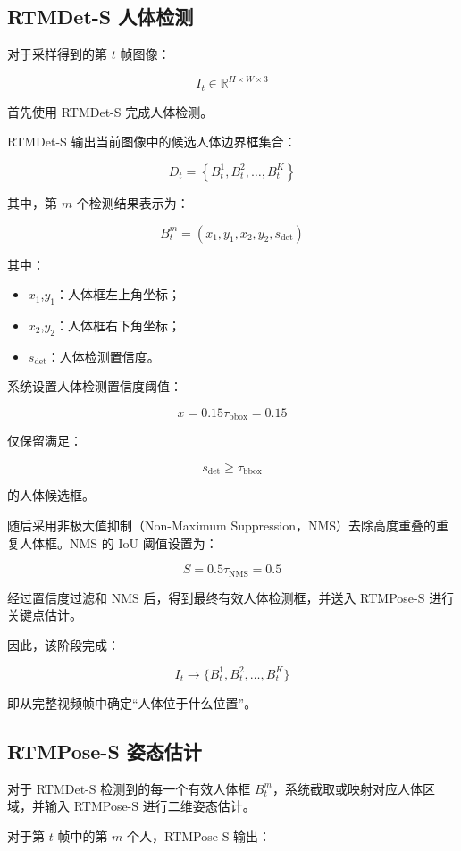 \subsection{RTMDet-S 人体检测}

对于采样得到的第 \(t\) 帧图像：

\[
I_t\in\mathbb{R}^{H\times W\times3}
\]

首先使用 RTMDet-S 完成人体检测。

RTMDet-S 输出当前图像中的候选人体边界框集合：

\[
D_t=
\left\{
B_t^1,B_t^2,\ldots,B_t^K
\right\}
\]

其中，第 \(m\) 个检测结果表示为：

\[
B_t^m=
(x_1,y_1,x_2,y_2,s_{\text{det}})
\]

其中：

\begin{itemize}
\item \(x_1\),\(y_1\)：人体框左上角坐标；
\item \(x_2\),\(y_2\)：人体框右下角坐标；
\item \(s_{\text{det}}\)：人体检测置信度。
\end{itemize}

系统设置人体检测置信度阈值：

\[
x=0.15\tau_{\text{bbox}}=0.15
\]

仅保留满足：

\[
s_{\text{det}}\geq\tau_{\text{bbox}}
\]

的人体候选框。

随后采用非极大值抑制（Non-Maximum Suppression，NMS）去除高度重叠的重复人体框。NMS 的 IoU 阈值设置为：

\[
S=0.5\tau_{\text{NMS}}=0.5
\]

经过置信度过滤和 NMS 后，得到最终有效人体检测框，并送入 RTMPose-S 进行关键点估计。

因此，该阶段完成：

\[
I_t
\rightarrow
\{B_t^1,B_t^2,\ldots,B_t^K\}
\]

即从完整视频帧中确定“人体位于什么位置”。

\subsection{RTMPose-S 姿态估计}

对于 RTMDet-S 检测到的每一个有效人体框 \(B_t^m\)，系统截取或映射对应人体区域，并输入 RTMPose-S 进行二维姿态估计。

对于第 \(t\) 帧中的第 \(m\) 个人，RTMPose-S 输出：

